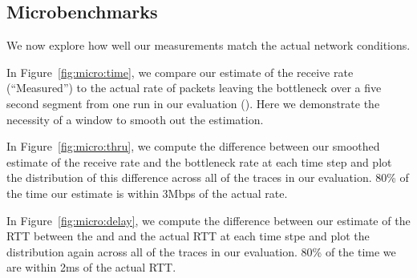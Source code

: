 \subsection{Microbenchmarks}
\label{s:measure:microbench}
    
    
    We now explore how well our measurements match the actual network conditions. 

    In Figure~\ref{fig:micro:time}, we compare our estimate of the receive rate (``Measured'')
    to the actual rate of packets 
    leaving the bottleneck over a five second segment from one run in our evaluation ().
    Here we demonstrate the necessity of a window to smooth out the estimation.

    In Figure~\ref{fig:micro:thru}, we compute the difference between our smoothed estimate of the receive rate 
    and the bottleneck rate at each time step and plot the distribution of this difference across
    all of the traces in our evaluation. 80\% of the time our estimate is within 3Mbps of the 
    actual rate.

    In Figure~\ref{fig:micro:delay}, we compute the difference between our estimate of the RTT between
    the \inbox and \outbox and the actual RTT at each time stpe and plot the distribution again
    across all of the traces in our evaluation. 80\% of the time we are within 2ms of the actual RTT.
    
